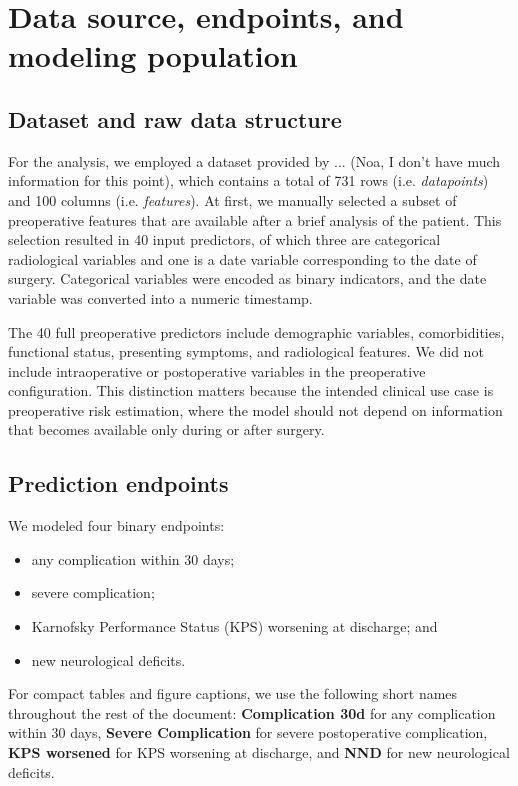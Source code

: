 \documentclass[11pt,a4paper]{article}
\begin{document}
\section{Data source, endpoints, and modeling population}

\subsection{Dataset and raw data structure}

For the analysis, we employed a dataset provided by ... (Noa, I don't have much information for this point), which contains a total of 731 rows (i.e. \emph{datapoints}) and 100 columns (i.e. \emph{features}). At first, we manually selected a subset of preoperative features that are available after a brief analysis of the patient. This selection resulted in 40 input predictors, of which three are categorical radiological variables and one is a date variable corresponding to the date of surgery. Categorical variables were encoded as binary indicators, and the date variable was converted into a numeric timestamp.

The 40 full preoperative predictors include demographic variables, comorbidities, functional status, presenting symptoms, and radiological features. We did not include intraoperative or postoperative variables in the preoperative configuration. This distinction matters because the intended clinical use case is preoperative risk estimation, where the model should not depend on information that becomes available only during or after surgery.

\subsection{Prediction endpoints}

We modeled four binary endpoints:

\begin{itemize}
    \item any complication within 30 days;
    \item severe complication;
    \item Karnofsky Performance Status (KPS) worsening at discharge; and
    \item new neurological deficits.
\end{itemize}

For compact tables and figure captions, we use the following short names throughout the rest of the document: \textbf{Complication 30d} for any complication within 30 days, \textbf{Severe Complication} for severe postoperative complication, \textbf{KPS worsened} for KPS worsening at discharge, and \textbf{NND} for new neurological deficits.
\end{document}
